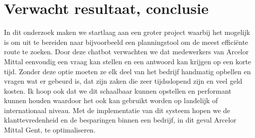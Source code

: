 \section{Verwacht resultaat, conclusie}%
\label{sec:verwachte_resultaten}
In dit onderzoek maken we startlaag aan een groter project waarbij het mogelijk is om uit te bereiden naar bijvoorbeeld een planningstool om de meest efficiënte route te zoeken.
Door deze chatbot verwachten we dat medewerkers van Arcelor Mittal eenvoudig een vraag kan stellen en een antwoord kan krijgen op een korte tijd.
Zonder deze optie moeten ze elk deel van het bedrijf handmatig opbellen en vragen wat er gebeurd is, dat zijn zaken die zeer tijdsslopend zijn en veel geld kosten.
Ik hoop ook dat we dit schaalbaar kunnen opstellen en performant kunnen houden waardoor het ook kan gebruikt worden op landelijk of internationaal niveau.
Met de implementatie van dit systeem hopen we de klanttevredenheid en de besparingen binnen een bedrijf, in dit geval Arcelor Mittal Gent, te optimaliseren.
